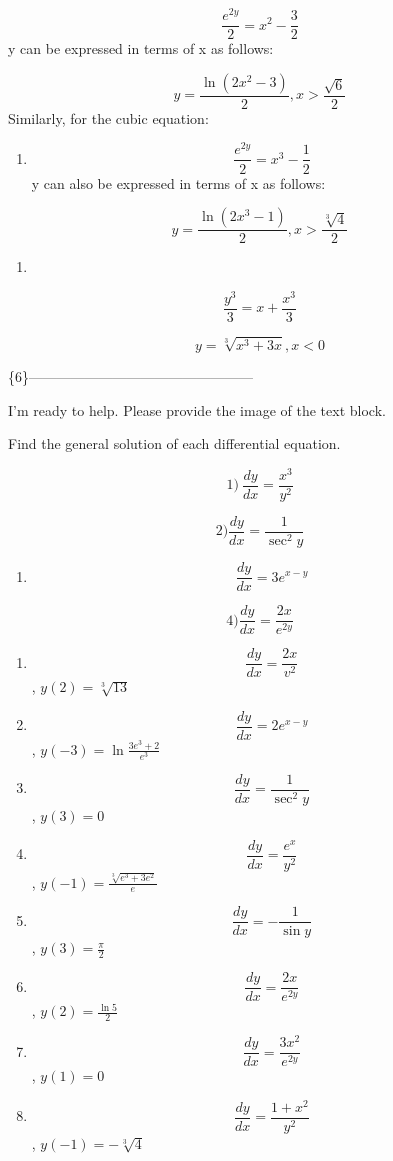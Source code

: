 \documentclass[
]{article}
\providecommand{\tightlist}{%
  \setlength{\itemsep}{0pt}\setlength{\parskip}{0pt}}
\begin{document}
\[\frac{e^{2y}}{2} = x^2 - \frac{3}{2}\] y can be expressed in terms of
x as follows:

\[y = \frac{\ln(2x^2 - 3)}{2}, x > \frac{\sqrt{6}}{2}\] Similarly, for
the cubic equation:

\begin{enumerate}
\def\labelenumi{\arabic{enumi})}
\setcounter{enumi}{10}
\tightlist
\item
  \[\frac{e^{2y}}{2} = x^3 - \frac{1}{2}\] y can also be expressed in
  terms of x as follows:
\end{enumerate}

\[y = \frac{\ln(2x^3 - 1)}{2}, x > \frac{\sqrt[3]{4}}{2}\]

\begin{enumerate}
\def\labelenumi{\arabic{enumi})}
\setcounter{enumi}{11}
\tightlist
\item
\end{enumerate}

\[\frac{y^3}{3} = x + \frac{x^3}{3}\]

\[y = \sqrt[3]{x^3 + 3x}, x < 0\]

\{6\}------------------------------------------------

I'm ready to help. Please provide the image of the text block.

Find the general solution of each differential equation.

\[1) \ \frac{dy}{dx} = \frac{x^3}{y^2}\]

\[2) \frac{dy}{dx} = \frac{1}{\sec^2 y}\]

\begin{enumerate}
\def\labelenumi{\arabic{enumi})}
\setcounter{enumi}{2}
\tightlist
\item
  \[\frac{dy}{dx} = 3e^{x-y}\]
\end{enumerate}

\[4) \frac{dy}{dx} = \frac{2x}{e^{2y}}\]

\begin{enumerate}
\def\labelenumi{\arabic{enumi})}
\setcounter{enumi}{4}
\item
  \[\frac{dy}{dx} = \frac{2x}{v^2}\] , \(y(2) = \sqrt[3]{13}\)
\item
  \[\frac{dy}{dx} = 2e^{x-y}\] , \(y(-3) = \ln \frac{3e^3 + 2}{e^3}\)
\item
  \[\frac{dy}{dx} = \frac{1}{\sec^2 y}\] , \(y(3) = 0\)
\item
  \[\frac{dy}{dx} = \frac{e^x}{y^2}\] ,
  \(y(-1) = \frac{\sqrt[3]{e^3 + 3e^2}}{e}\)
\item
  \[\frac{dy}{dx} = -\frac{1}{\sin y}\] , \(y(3) = \frac{\pi}{2}\)
\item
  \[\frac{dy}{dx} = \frac{2x}{e^{2y}}\] , \(y(2) = \frac{\ln 5}{2}\)
\item
  \[\frac{dy}{dx} = \frac{3x^2}{e^{2y}}\] , \(y(1) = 0\)
\item
  \[\frac{dy}{dx} = \frac{1+x^2}{y^2}\] , \(y(-1) = -\sqrt[3]{4}\)
\end{enumerate}
\end{document}
